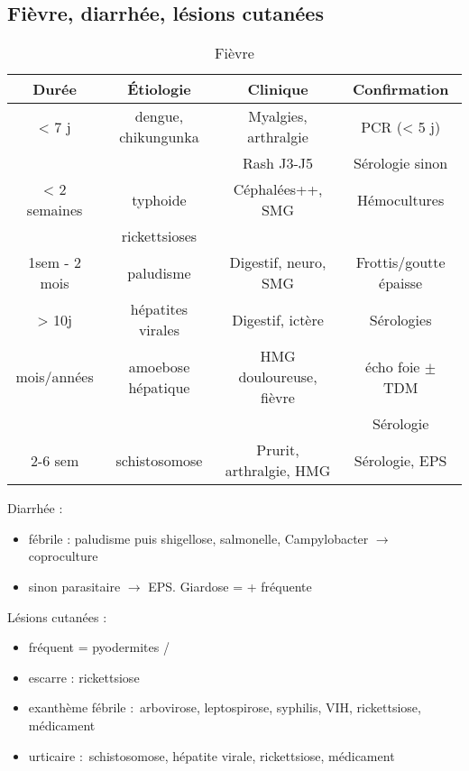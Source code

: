 \subsection{Fièvre, diarrhée, lésions cutanées}
\begin{table}[htpb]
  \centering
  \caption{Fièvre}
  \begin{tabular}{*{4}{c}}
  \toprule
  Durée        & Étiologie           & Clinique                & Confirmation \\
  \midrule
  < 7 j        & dengue, chikungunka & Myalgies, arthralgie    & PCR (< 5 j)\\
               &                     & Rash J3-J5              & Sérologie sinon\\
  \midrule
  < 2 semaines & typhoide            & Céphalées++, SMG        & Hémocultures\\
               & rickettsioses       & &\\
  \midrule
  1sem - 2 mois& paludisme          & Digestif, neuro, SMG     & Frottis/goutte épaisse\\
  > 10j        & hépatites virales  & Digestif, ictère        & Sérologies \\
  mois/années  & amoebose hépatique & HMG douloureuse, fièvre & écho foie $\pm$ TDM\\
               &                    &                         & Sérologie\\
  2-6 sem      & schistosomose      & Prurit, arthralgie, HMG & Sérologie, EPS\\
  \bottomrule
  \end{tabular}
\end{table}

Diarrhée :
\begin{itemize}
  \item fébrile : paludisme puis shigellose, salmonelle, Campylobacter
    $\rightarrow$ coproculture
  \item sinon parasitaire $\rightarrow$ EPS. Giardose = + fréquente
\end{itemize}

Lésions cutanées : 
\begin{itemize}
  \item fréquent = pyodermites /
  \item escarre : rickettsiose
  \item exanthème fébrile : arbovirose, leptospirose, syphilis, VIH,
    rickettsiose, médicament
  \item urticaire : schistosomose, hépatite virale, rickettsiose, médicament
\end{itemize} 

